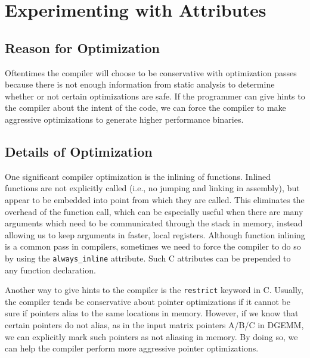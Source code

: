 
\section{Experimenting with Attributes}
\label{sec-opts-attr}

\subsection{Reason for Optimization}

Oftentimes the compiler will choose to be conservative with optimization
passes because there is not enough information from static analysis to
determine whether or not certain optimizations are safe. If the
programmer can give hints to the compiler about the intent of the code,
we can force the compiler to make aggressive optimizations to generate
higher performance binaries.
\smallskip

\subsection{Details of Optimization}

One significant compiler optimization is the inlining of
functions. Inlined functions are not explicitly called (i.e., no jumping
and linking in assembly), but appear to be embedded into point from which
they are called. This eliminates the overhead of the function call,
which can be especially useful when there are many arguments which need
to be communicated through the stack in memory, instead allowing us to
keep arguments in faster, local registers. Although function inlining is
a common pass in compilers, sometimes we need to force the compiler to do
so by using the {\tt{always\_inline}} attribute. Such C attributes can be
prepended to any function declaration.
\smallskip

Another way to give hints to the compiler is the {\tt{restrict}} keyword
in C. Usually, the compiler tends be conservative about pointer
optimizations if it cannot be sure if pointers alias to the same
locations in memory. However, if we know that certain pointers do not
alias, as in the input matrix pointers A/B/C in DGEMM, we can explicitly
mark such pointers as not aliasing in memory. By doing so, we can help
the compiler perform more aggressive pointer optimizations.
\smallskip

